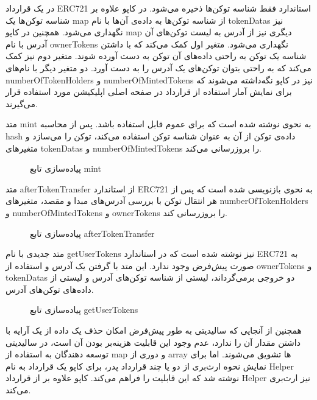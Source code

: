 در یک قرارداد ERC721 استاندارد فقط شناسه توکن‌ها ذخیره می‌شود. در کاپو علاوه بر شناسه توکن‌ها یک map از شناسه توکن‌ها به داده‌ی آن‌ها با نام tokenDatas نیز نگهداری می‌شود. همچنین در کاپو map دیگری نیز از آدرس به لیست توکن‌های آن آدرس با نام ownerTokens نگهداری می‌شود. متغیر اول کمک می‌کند که با داشتن شناسه یک توکن به راحتی داده‌های آن توکن به دست آورده شوند. متغیر دوم نیز کمک می‌کند که به راحتی بتوان توکن‌های یک آدرس را به دست آورد. دو متغیر دیگر با نام‌های numberOfTokenHolders و numberOfMintedTokens نیز در کاپو نگه‌داشته می‌شوند که برای نمایش آمار استفاده از قرارداد در صفحه اصلی اپلیکیشن مورد استفاده قرار می‌گیرند.

متد mint به نحوی نوشته شده است که برای عموم قابل استفاده باشد. پس از محاسبه hash داده‌ی توکن از آن به عنوان شناسه توکن استفاده می‌کند، توکن را می‌سازد و متغیرهای tokenDatas و numberOfMintedTokens را بروزرسانی می‌کند.

\begin{figure}[ht]
\centerline{}
\caption{پیاده‌سازی تابع mint}
\label{fig:mint}
\end{figure}

متد afterTokenTransfer از استاندارد ERC721 به نحوی بازنویسی
شده است که پس از هر انتقال توکن با بررسی آدرس‌های مبدا و مقصد، متغیر‌های numberOfTokenHolders و numberOfMintedTokens و ownerTokens را بروزرسانی کند.

\begin{figure}[ht]
\centerline{}
\caption{پیاده‌سازی تابع afterTokenTransfer}
\label{fig:afterTokenTransfer}
\end{figure}

متد جدیدی با نام getUserTokens نیز نوشته شده است که در استاندارد ERC721 به صورت پیش‌فرض وجود ندارد. این متد با گرفتن یک آدرس و استفاده از ownerTokens و tokenDatas دو خروجی برمی‌گرداند، لیستی از شناسه توکن‌های آدرس و لیستی از داده‌های توکن‌های آدرس.

\begin{figure}[ht]
\centerline{}
\caption{پیاده‌سازی تابع getUserTokens}
\label{fig:getUserTokens}
\end{figure}

همچنین از آنجایی که سالیدیتی به طور پیش‌فرض امکان حذف یک داده از یک آرایه با داشتن مقدار آن را ندارد، عدم وجود این قابلیت هزینه‌بر بودن آن است، در سالیدیتی توسعه دهندگان به استفاده از map و دوری از array ها تشویق می‌شوند. اما برای نمایش نحوه ارث‌بری از دو یا چند قرارداد پدر، برای کاپو یک قرارداد به نام Helper نوشته شد که این قابلیت را فراهم می‌کند. کاپو علاوه بر
از قرارداد Helper نیز ارث‌بری می‌کند.

